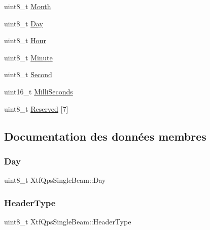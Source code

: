 \begin{DoxyCompactItemize}
\item 
uint8\+\_\+t \hyperlink{structXtfQpsSingleBeam_a53ea862c5b772dcf4b99fd5df655b022}{Month}
\item 
uint8\+\_\+t \hyperlink{structXtfQpsSingleBeam_a698637fa1b0163b975d240e2700ecae4}{Day}
\item 
uint8\+\_\+t \hyperlink{structXtfQpsSingleBeam_ad4cf175dd2824eeca91781c980a6cbda}{Hour}
\item 
uint8\+\_\+t \hyperlink{structXtfQpsSingleBeam_a64bf1f23b4edb8bf914023065ebd3acc}{Minute}
\item 
uint8\+\_\+t \hyperlink{structXtfQpsSingleBeam_a6b1becf750b502b4d4f25557e1e10da5}{Second}
\item 
uint16\+\_\+t \hyperlink{structXtfQpsSingleBeam_a790fa68fcc3c65e3b4f47b2573383d11}{Milli\+Seconds}
\item 
uint8\+\_\+t \hyperlink{structXtfQpsSingleBeam_aede9d1b8bca89c61d02441597bd28ad9}{Reserved} \mbox{[}7\mbox{]}
\end{DoxyCompactItemize}


\subsection{Documentation des données membres}
\mbox{\label{structXtfQpsSingleBeam_a698637fa1b0163b975d240e2700ecae4}} 
\subsubsection{\texorpdfstring{Day}{Day}}
{\footnotesize\ttfamily uint8\+\_\+t Xtf\+Qps\+Single\+Beam\+::\+Day}

\mbox{\label{structXtfQpsSingleBeam_a029a5abb8e60511708890df28ae3967c}} 
\subsubsection{\texorpdfstring{Header\+Type}{HeaderType}}
{\footnotesize\ttfamily uint8\+\_\+t Xtf\+Qps\+Single\+Beam\+::\+Header\+Type}

\mbox{\label{structXtfQpsSingleBeam_ad4cf175dd2824eeca91781c980a6cbda}} 
